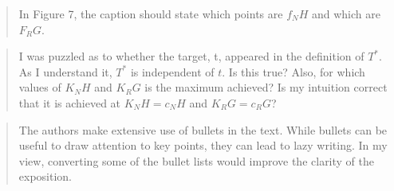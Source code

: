 \documentclass{article}
\begin{document}
\begin{quote}
    \begin{textit}
        {
        In Figure 7, the caption should state which points are \(f_NH\) and
        which are \(F_RG\).
        }
    \end{textit}
\end{quote}

\begin{quote}
    \begin{textit}
        {
I was puzzled as to whether the target, t, appeared in the definition
of \(T^*\). As I understand it, \(T^*\) is independent of \(t\). Is this true?
Also, for which values of \(K_NH\) and \(K_RG\) is the maximum achieved? Is my
intuition correct that it is achieved at \(K_NH = c_NH\) and \(K_RG = c_RG\)?
        }
    \end{textit}
\end{quote}

\begin{quote}
    \begin{textit}
        {
The authors make extensive use of bullets in the text. While bullets
can be useful to draw attention to key points, they can lead to lazy
writing. In my view, converting some of the bullet lists would improve
the clarity of the exposition.
        }
    \end{textit}
\end{quote}
\end{document}
